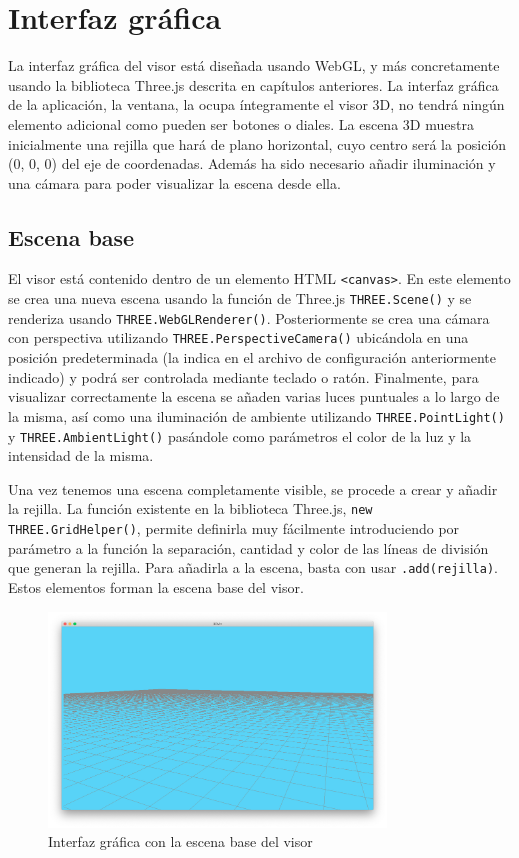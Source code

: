 \section{Interfaz gráfica}
La interfaz gráfica del visor está diseñada usando WebGL, y más concretamente usando la biblioteca Three.js descrita en capítulos anteriores. La interfaz gráfica de la aplicación, la ventana, la ocupa íntegramente el visor 3D, no tendrá ningún elemento adicional como pueden ser botones o diales. La escena 3D muestra inicialmente una rejilla que hará de plano horizontal, cuyo centro será la posición (0, 0, 0) del eje de coordenadas. Además ha sido necesario añadir iluminación y una cámara para poder visualizar la escena desde ella.

\subsection{Escena base}
El visor está contenido dentro de un elemento HTML \texttt{<canvas>}. En este elemento se crea una nueva escena usando la función de Three.js \texttt{THREE.Scene()} y se renderiza usando \texttt{THREE.WebGLRenderer()}. Posteriormente se crea una cámara con perspectiva utilizando \texttt{THREE.PerspectiveCamera()} ubicándola en una posición predeterminada (la indica en el archivo de configuración anteriormente indicado) y podrá ser controlada mediante teclado o ratón. Finalmente, para visualizar correctamente la escena se añaden varias luces puntuales a lo largo de la misma, así como una iluminación de ambiente utilizando \texttt{THREE.PointLight()} y \texttt{THREE.AmbientLight()} pasándole como parámetros el color de la luz y la intensidad de la misma.

Una vez tenemos una escena completamente visible, se procede a crear y añadir la rejilla. La función existente en la biblioteca Three.js, \texttt{new THREE.GridHelper()}, permite definirla muy fácilmente introduciendo por parámetro a la función la separación, cantidad y color de las líneas de división que generan la rejilla. Para añadirla a la escena, basta con usar \texttt{.add(rejilla)}. Estos elementos forman la escena base del visor.

\begin{figure}[H]
  \begin{center}
    \includegraphics[width=0.8\textwidth]{figures/interfazinicial.png}
		\caption{Interfaz gráfica con la escena base del visor}
		\label{fig.interfazinicial}
		\end{center}
\end{figure}

